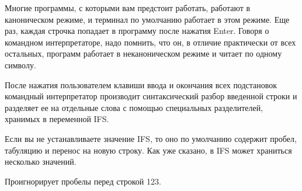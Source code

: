 Многие программы, с которыми вам предстоит работать, работают в каноническом режиме, и терминал по умолчанию работает в этом режиме. Еще раз, каждая строчка попадает в программу после нажатия Enter. Говоря о командном интерпретаторе, надо помнить, что он, в отличие практически от всех остальных, программ работает в неканоническом режиме и читает по одному символу.

После нажатия пользователем клавиши ввода и окончания всех подстановок командный интерпретатор производит синтаксический разбор введенной строки и разделяет ее на отдельные слова с помощью специальных разделителей, хранимых в переменной IFS.

Если вы не устанавливаете значение IFS, то оно по умолчанию содержит пробел, табуляцию и перенос на новую строку. Как уже сказано, в IFS может храниться несколько значений.

Проигнорирует пробелы перед строкой 123.

